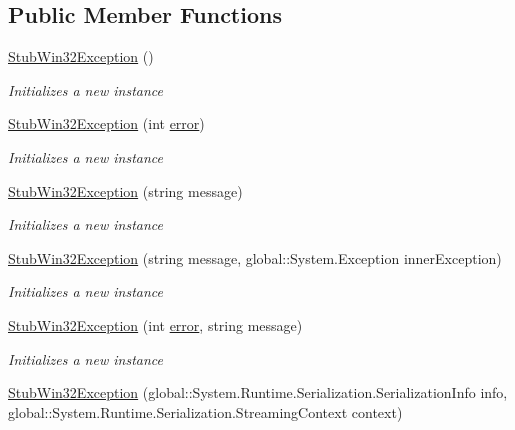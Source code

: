 \subsection*{Public Member Functions}
\begin{DoxyCompactItemize}
\item 
\hyperlink{class_system_1_1_component_model_1_1_fakes_1_1_stub_win32_exception_a3f6dc2f03c24eae90b1971261bfcd1f3}{Stub\-Win32\-Exception} ()
\begin{DoxyCompactList}\small\item\em Initializes a new instance\end{DoxyCompactList}\item 
\hyperlink{class_system_1_1_component_model_1_1_fakes_1_1_stub_win32_exception_ab12c23920066de9276520ff286a429d6}{Stub\-Win32\-Exception} (int \hyperlink{jquery-1_810_82-vsdoc_8js_acd25716dc66c2c57df2fc97807ffbddf}{error})
\begin{DoxyCompactList}\small\item\em Initializes a new instance\end{DoxyCompactList}\item 
\hyperlink{class_system_1_1_component_model_1_1_fakes_1_1_stub_win32_exception_ac9c4dfa0176489a643f2b71cd90fd5fd}{Stub\-Win32\-Exception} (string message)
\begin{DoxyCompactList}\small\item\em Initializes a new instance\end{DoxyCompactList}\item 
\hyperlink{class_system_1_1_component_model_1_1_fakes_1_1_stub_win32_exception_a31a449b3dad752fcc132a2b3efc3b42d}{Stub\-Win32\-Exception} (string message, global\-::\-System.\-Exception inner\-Exception)
\begin{DoxyCompactList}\small\item\em Initializes a new instance\end{DoxyCompactList}\item 
\hyperlink{class_system_1_1_component_model_1_1_fakes_1_1_stub_win32_exception_a64bd1b3300e1e2d3c6287308498a7592}{Stub\-Win32\-Exception} (int \hyperlink{jquery-1_810_82-vsdoc_8js_acd25716dc66c2c57df2fc97807ffbddf}{error}, string message)
\begin{DoxyCompactList}\small\item\em Initializes a new instance\end{DoxyCompactList}\item 
\hyperlink{class_system_1_1_component_model_1_1_fakes_1_1_stub_win32_exception_acfd9b1d47af2217a5c94aed971a73353}{Stub\-Win32\-Exception} (global\-::\-System.\-Runtime.\-Serialization.\-Serialization\-Info info, global\-::\-System.\-Runtime.\-Serialization.\-Streaming\-Context context)

\end{DoxyCompactItemize}
